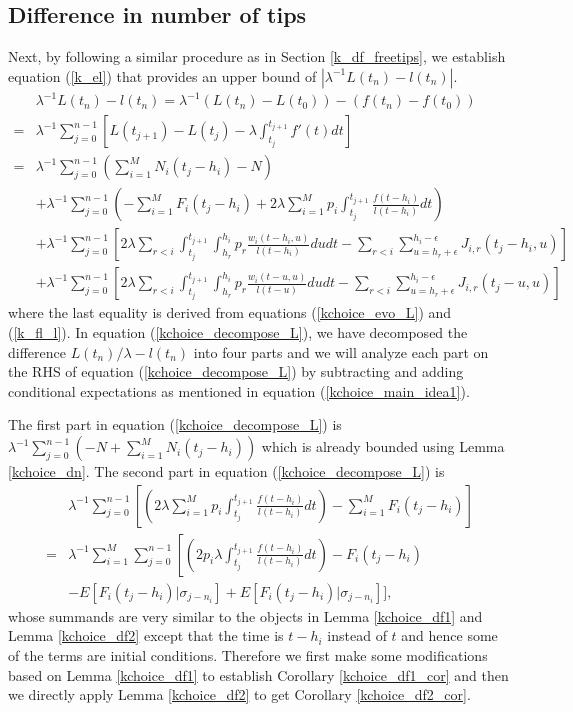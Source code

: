 \documentclass[12pt]{article}
\numberwithin{equation}{section}  %
\begin{document}
\subsection{Difference in number of tips}\label{k_df_tips}
Next, by following a similar procedure as in Section \ref{k_df_freetips}, we establish equation (\ref{k_el}) that provides an upper bound of $\left|\lambda^{-1}L(t_n)-l(t_n)\right|$.
\begin{align}
&\lambda^{-1}L(t_n)-l(t_n)=\lambda^{-1}(L(t_n)-L(t_0))-(f(t_n)-f(t_0))\nonumber\\
=&\lambda^{-1}\sum_{j=0}^{n-1}
\left[
L(t_{j+1})-L(t_j)-\lambda\int_{t_j}^{t_{j+1}}f'(t)dt
\right]\nonumber\\
=&\lambda^{-1}\sum_{j=0}^{n-1}\left(
\sum_{i=1}^{M} N_i(t_j-h_i)-N\right)\nonumber\\
&+\lambda^{-1}\sum_{j=0}^{n-1}\left(
-\sum_{i=1}^M F_i(t_j-h_i)+2\lambda\sum_{i=1}^M p_i\int_{t_j}^{t_{j+1}}\frac{f(t-h_i)}{l(t-h_i)}dt
\right)\nonumber\\
&+\lambda^{-1}\sum_{j=0}^{n-1}\left[
2\lambda\sum_{r<i}\int_{t_j}^{t_{j+1}}\int_{h_r}^{h_i}p_r\frac{w_i(t-h_i,u)}{l(t-h_i)}dudt-
\sum_{r<i}\sum_{u=h_r+\epsilon}^{h_i-\epsilon}J_{i,r}(t_j-h_i,u)
\right]\nonumber\\
&+\lambda^{-1}\sum_{j=0}^{n-1}\left[
2\lambda\sum_{r<i}\int_{t_j}^{t_{j+1}}\int_{h_r}^{h_i}p_r\frac{w_i(t-u,u)}{l(t-u)}dudt-
\sum_{r<i}\sum_{u=h_r+\epsilon}^{h_i-\epsilon}J_{i,r}(t_j-u,u)
\right]\label{kchoice_decompose_L}
\end{align}
where the last equality is derived from equations (\ref{kchoice_evo_L}) and (\ref{k_fl_l}). In equation (\ref{kchoice_decompose_L}), we have decomposed the difference $L(t_n)/\lambda-l(t_n)$ into four parts and we will analyze each part on the RHS of equation (\ref{kchoice_decompose_L}) by subtracting and adding conditional expectations as mentioned in equation (\ref{kchoice_main_idea1}). 

The first part in equation (\ref{kchoice_decompose_L}) is
$\lambda^{-1}\sum_{j=0}^{n-1} \left(-N+\sum_{i=1}^M N_i(t_j-h_i)\right)$
which is already bounded using Lemma \ref{kchoice_dn}. The second part in equation (\ref{kchoice_decompose_L}) is
\begin{align*} 
&\lambda^{-1}\sum_{j=0}^{n-1}\left[\left(
2\lambda\sum_{i=1}^M p_i\int_{t_j}^{t_{j+1}}\frac{f(t-h_i)}{l(t-h_i)}dt
\right)
-\sum_{i=1}^M F_i(t_j-h_i)
\right]\\
=&\lambda^{-1}\sum_{i=1}^M \sum_{j=0}^{n-1}\left[\left(
2 p_i\lambda\int_{t_j}^{t_{j+1}}\frac{f(t-h_i)}{l(t-h_i)}dt
\right)-F_i(t_j-h_i)\right.\\
& -E[F_i(t_j-h_i)|\sigma_{j-n_i}] +E[F_i(t_j-h_i)|\sigma_{j-n_i}]
\Biggr],
\end{align*} 
whose summands are very similar to the objects in Lemma \ref{kchoice_df1} and Lemma \ref{kchoice_df2} except that the time is $t-h_i$ instead of $t$ and hence some of the terms are initial conditions. Therefore we first make some modifications based on Lemma \ref{kchoice_df1} to establish Corollary \ref{kchoice_df1_cor} and then we directly apply Lemma \ref{kchoice_df2} to get Corollary \ref{kchoice_df2_cor}.
\end{document}
